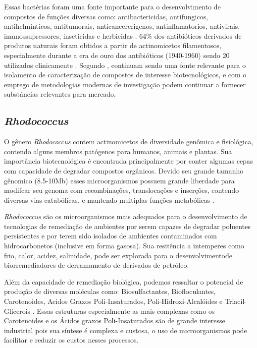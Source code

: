 Essas bactérias foram uma fonte importante para o desenvolvimento de compostos de funções
diversas como: antibactericidas, antifungicos, antihelminticos, antitumorais, anticancererigenos,
antinflamatorios, antivirais, imunossupressores, inseticidas e herbicidas \cite{demain2009,jose2021}. 
64\% dos antibióticos derivados de produtos naturais foram obtidos a partir de actinomicetos filamentosos,
especialmente durante a era de ouro dos antibióticos (1940-1960) sendo 20 utilizados clinicamente \cite{hutchings2019} .
Segundo , continuam sendo uma fonte relevante
para o isolamento de caracterização de compostos de interesse biotecnológicos, e com o
emprego de metodologias modernas de investigação podem continuar a fornecer
substâncias relevantes para mercado. 


\subsection{\textit{Rhodococcus}}
O gênero \textit{Rhodococcus} contem actinomicetos de diversidade genômica e fisiológica,
contendo alguns membros patógenos para humanos, animais e plantas. Sua importância biotecnológica
é encontrada principalmente por conter algumas cepas com capacidade de degradar compostos orgânicos.
Devido seu grande tamanho gênomico (8.5-10Mb) esses microorganismos possuem grande liberdade
para modifcar seu genoma com recombinações, translocações e inserções, contendo diversas vias catabólicas,
e mantendo multiplas funções metabólicas \cite{cappelletti2019}.

\textit{Rhodococcus} são os microorganismos mais adequados para o desenvolvimento de
tecnologias de remediação de ambientes por serem capazes de degradar poluentes persistentes e por
terem sido isolados de ambientes contaminados com hidrocarbonetos 
(inclusive em forma gasosa)\cite{kuyukina2019}. Sua resitência a intemperes como frio, calor, acidez,
salinidade, pode ser explorada para o desenvolvimentode biorremediadores de derramamento de derivados
de petróleo.

Além da capacidade de remediação biológica, podemos ressaltar o potencial de produção de diversas moléculas
como: Biosulfactantes, Biofloculantes, Carotenoides, Acidos Graxos Poli-Insaturados, Poli-Hidroxi-Alcalóides e
Triacil-Glicerois \cite{cappelletti2020}. Essas estruturas especialmente as mais complexas como os
Carotenoides e os Ácidos graxos Poli-Insaturados são de grande interesse industrial pois sua síntese 
é complexa e custosa, o uso de microorganismos pode facilitar e reduzir os custos nesses processos.

